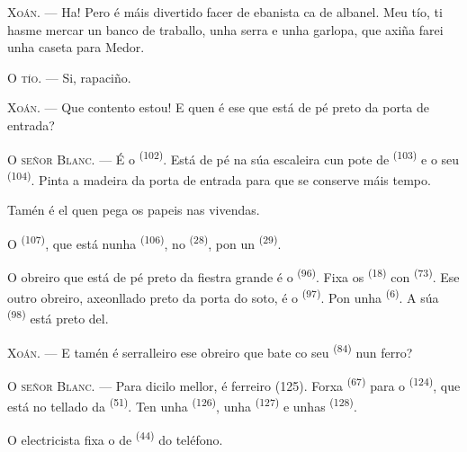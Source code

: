 \textsc{Xoán}. --- Ha! Pero é máis divertido facer de ebanista ca de albanel. Meu tío, ti
hasme mercar un banco de traballo, unha serra e unha garlopa, que axiña farei unha caseta para
Medor.

\textsc{O tío}. --- Si, rapaciño.

\textsc{Xoán}. --- Que contento estou! E quen é ese que está de pé preto da porta de entrada?

\VUsaut{3.0mm}
\VUsaut{3.0mm}

\textsc{O señor Blanc}. --- É o  \textsuperscript{(102)}. Está de pé na súa
escaleira cun pote de  \textsuperscript{(103)} e o seu
 \textsuperscript{(104)}. Pinta a madeira da porta de entrada para que
se conserve máis tempo.

Tamén é el quen pega os papeis nas vivendas.

O  \textsuperscript{(107)}, que está nunha 
\textsuperscript{(106)}, no  \textsuperscript{(28)}, pon un
 \textsuperscript{(29)}.

O obreiro que está de pé preto da fiestra grande é o  \textsuperscript{(96)}.
Fixa os  \textsuperscript{(18)} con
 \textsuperscript{(73)}. Ese outro obreiro, axeonllado preto da porta
do soto, é o  \textsuperscript{(97)}. Pon unha
 \textsuperscript{(6)}. A súa 
\textsuperscript{(98)} está preto del.

\textsc{Xoán}. --- E tamén é serralleiro ese obreiro que bate co seu
 \textsuperscript{(84)} nun ferro?

\textsc{O señor Blanc}. --- Para dicilo mellor, é ferreiro (125). Forxa
 \textsuperscript{(67)} para o 
\textsuperscript{(124)}, que está no tellado da  \textsuperscript{(51)}. Ten
unha  \textsuperscript{(126)}, unha
 \textsuperscript{(127)} e unhas 
\textsuperscript{(128)}.

O electricista fixa o  de  \textsuperscript{(44)} do teléfono.

\VUsaut{3.0mm}

